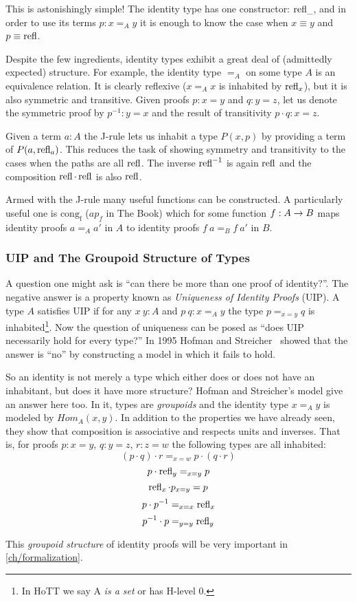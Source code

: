 This is astonishingly simple! The identity type has one constructor: $\operatorname{refl}_{\_}$,
and in order to use its terms $p : x =_A y$ it is enough to know the case when $x
\equiv y$ and $p \equiv \operatorname{refl}$.

Despite the few ingredients, identity types exhibit a great deal of (admittedly
expected) structure. For example, the identity type $=_A$ on some type $A$ is an
equivalence relation. It is clearly reflexive ($x =_A x$ is inhabited by
$\operatorname{refl}_x$), but it is also symmetric and transitive. Given proofs $p : x = y$
and $q : y = z$, let us denote the symmetric proof by $p^{-1} : y = x$ and the
result of transitivity $p \cdot q : x = z$.

Given a term $a:A$ the J-rule lets us inhabit a type $P(x,p)$ by providing a
term of $P(a, \operatorname{refl}_a)$. This reduces the task of showing symmetry and
transitivity to the cases when the paths are all $\operatorname{refl}$. The inverse $\operatorname{refl}^{-1}$
is again $\operatorname{refl}$ and the composition $\operatorname{refl} \cdot \operatorname{refl}$ is also $\operatorname{refl}$.

Armed with the J-rule many useful functions can be constructed. A particularly
useful one is $\operatorname{cong_f}$ ($ap_f$ in The Book) which for some
function $f : A \rightarrow B$ maps identity proofs $a =_A a'$ in $A$ to identity proofs
$f~a =_B f~a'$ in $B$.


\subsubsection{UIP and The Groupoid Structure of Types}

A question one might ask is ``can there be more than one proof of identity?''.
The negative answer is a property known as \emph{Uniqueness of Identity Proofs} (UIP). A
type $A$ satisfies UIP if for any $x~y : A$ and $p~q : x =_A y$ the type $p =_{x
= y} q$ is inhabited\footnote{In HoTT we say A \emph{is a set} or has H-level 0.}. Now the
question of uniqueness can be posed as ``does UIP necessarily hold for every type?'' In 1995
Hofman and Streicher~\cite{Hofman1998} showed that the answer is ``no'' by
constructing a model in which it fails to hold.

So an identity is not merely a type which either does or does not have an
inhabitant, but does it have more structure?
Hofman and Streicher's model give an answer here too. In it, types are \emph{groupoids} and the
identity type $x =_A y$ is modeled by $Hom_A(x, y)$. In addition to the
properties we have already seen, they show that composition is associative and
respects units and inverses. That is, for proofs $p : x = y$, $q : y = z$, $r :
z = w$ the following types are all inhabited:
\[(p \cdot q) \cdot r =_{x = w} p \cdot (q \cdot r)\]
\[p \cdot \operatorname{refl}_y =_{x = y} p\]
\[\operatorname{refl}_x \cdot p_{x = y} = p\]
\[p \cdot p^{-1} =_{x = x} \operatorname{refl}_x\]
\[p^{-1} \cdot p =_{y = y} \operatorname{refl}_y\]

This \emph{groupoid structure} of identity proofs will be very important in \autoref{ch/formalization}.
